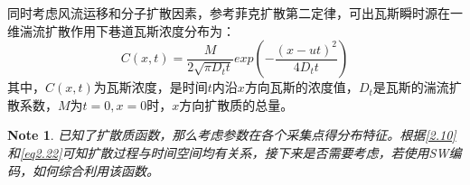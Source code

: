\documentclass[UTF8]{ctexart}
\theoremstyle{plain}
\newtheorem{note}{Note}
\begin{document}
同时考虑风流运移和分子扩散因素，参考菲克扩散第二定律，可出瓦斯瞬时源在一维湍流扩散作用下巷道瓦斯浓度分布为：
\begin{equation}
    C(x,t) = \dfrac{M}{2\sqrt{\pi D_t t}}exp(-\dfrac{(x-ut)^2}{4D_t t})
    \label{eq2.22}
\end{equation}
其中，$C(x,t)$为瓦斯浓度，是时间$t$内沿$x$方向瓦斯的浓度值，$D_t$是瓦斯的湍流扩散系数，$M$为$t=0,x=0$时，$x$方向扩散质的总量。

\begin{note}
    已知了扩散质函数，那么考虑参数在各个采集点得分布特征。根据\cref{2.10}和\cref{eq2.22}可知扩散过程与时间空间均有关系，接下来是否需要考虑，若使用SW编码，如何综合利用该函数。
\end{note}


\end{document}
